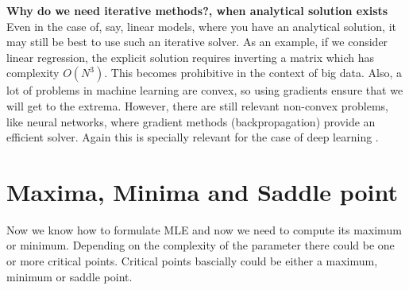 \noindent\textbf{Why do we need iterative methods?, when analytical solution exists}\cite{iter} \\

\noindent Even in the case of, say, linear models, where you have an analytical solution, it may still be best to use such an iterative solver. As an example, if we consider linear regression, the explicit solution requires inverting a matrix which has complexity $O(N^3)$. This becomes prohibitive in the context of big data. Also, a lot of problems in machine learning are convex, so using gradients ensure that we will get to the extrema. However, there are still relevant non-convex problems, like neural networks, where gradient methods (backpropagation) provide an efficient solver. Again this is specially relevant for the case of deep learning \cite{iter}.

\section{Maxima, Minima and Saddle point}
Now we know how to formulate MLE and now we need to compute its maximum or minimum. Depending on the complexity of the parameter there could be one or more critical points. Critical points bascially could be either a maximum, minimum or saddle point. 
